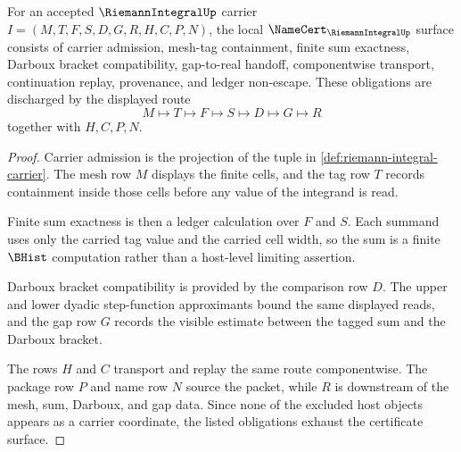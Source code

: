 \begin{theorem}
\label{thm:riemann-integral-namecert-obligations}
For an accepted $\RiemannIntegralUp$ carrier $I=(M,T,F,S,D,G,R,H,C,P,N)$, the local $\NameCert_{\RiemannIntegralUp}$ surface consists of carrier admission, mesh-tag containment, finite sum exactness, Darboux bracket compatibility, gap-to-real handoff, componentwise transport, continuation replay, provenance, and ledger non-escape. These obligations are discharged by the displayed route
$$
M\longmapsto T\longmapsto F\longmapsto S\longmapsto D\longmapsto G\longmapsto R
$$
together with $H,C,P,N$.
\end{theorem}
\begin{proof}
Carrier admission is the projection of the tuple in \autoref{def:riemann-integral-carrier}. The mesh row $M$ displays the finite cells, and the tag row $T$ records containment inside those cells before any value of the integrand is read.

Finite sum exactness is then a ledger calculation over $F$ and $S$. Each summand uses only the carried tag value and the carried cell width, so the sum is a finite $\BHist$ computation rather than a host-level limiting assertion.

Darboux bracket compatibility is provided by the comparison row $D$. The upper and lower dyadic step-function approximants bound the same displayed reads, and the gap row $G$ records the visible estimate between the tagged sum and the Darboux bracket.

The rows $H$ and $C$ transport and replay the same route componentwise. The package row $P$ and name row $N$ source the packet, while $R$ is downstream of the mesh, sum, Darboux, and gap data. Since none of the excluded host objects appears as a carrier coordinate, the listed obligations exhaust the certificate surface.
\end{proof}

